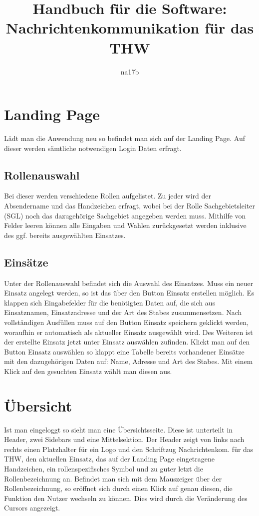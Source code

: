 \documentclass[a4paper,11pt,oneside, titlepage]{article}
\title{Handbuch für die Software: Nachrichtenkommunikation für das THW}
\author{na17b}
\date{}
\begin{document}
	\maketitle
	\tableofcontents
	
	\newpage
	
	\section{Landing Page}
	Lädt man die Anwendung neu so befindet man sich auf der Landing Page. Auf dieser werden sämtliche notwendigen Login Daten erfragt.
	
	\subsection{Rollenauswahl}
	Bei dieser werden verschiedene Rollen aufgelistet. Zu jeder wird der Absendername und das Handzeichen erfragt, wobei bei der Rolle Sachgebietsleiter (SGL) noch das dazugehörige Sachgebiet angegeben werden muss.
	\newline
	Mithilfe von \glqq{}Felder leeren\grqq{} können alle Eingaben und Wahlen zurückgesetzt werden inklusive des ggf. bereits ausgewählten Einsatzes.
	
	\subsection{Einsätze}
	Unter der Rollenauswahl befindet sich die Auswahl des Einsatzes.
	Muss ein neuer Einsatz angelegt werden, so ist das über den Button \glqq{}Einsatz erstellen\grqq{} möglich. Es klappen sich Eingabefelder für die benötigten Daten auf, die sich aus Einsatznamen, Einsatzadresse und der Art des Stabes zusammensetzen. Nach vollständigen Ausfüllen muss auf den Button \glqq{} Einsatz speichern \grqq{} geklickt werden, woraufhin er automatisch als aktueller Einsatz ausgewählt wird. Des Weiteren ist der erstellte Einsatz jetzt unter \glqq{} Einsatz auswählen \grqq zufinden.
	\newline
	\newline
	Klickt man auf den Button \glqq{}Einsatz auswählen\grqq{} so klappt eine Tabelle bereits vorhandener Einsätze mit den dazugehörigen Daten auf: Name, Adresse und Art des Stabes. Mit einem Klick auf den gesuchten Einsatz wählt man diesen aus.
	
	\section{Übersicht}
	Ist man eingeloggt so sieht man eine Übersichtsseite. Diese ist unterteilt in Header, zwei Sidebars und eine Mittelsektion.
	Der Header zeigt von links nach rechts einen Platzhalter für ein Logo und den Schriftzug \glqq{} Nachrichtenkom. für das THW\grqq{}, den aktuellen Einsatz, das auf der Landing Page eingetragene Handzeichen, ein rollenspezifisches Symbol und zu guter letzt die Rollenbezeichnung an. 
	Befindet man sich mit dem Mauszeiger über der Rollenbezeichnung, so eröffnet sich durch einen Klick auf genau diesen, die Funktion den Nutzer wechseln zu können. Dies wird durch die Veränderung des Cursors angezeigt.
		
\end{document}
